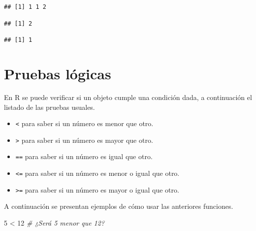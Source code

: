 \documentclass[10pt,]{krantz}
\makeatletter
\newenvironment{Shaded}{\begin{snugshade}}{\end{snugshade}}
\newcommand{\DecValTok}[1]{\textcolor[rgb]{0.00,0.00,0.81}{{#1}}}
\newcommand{\StringTok}[1]{\textcolor[rgb]{0.31,0.60,0.02}{{#1}}}
\newcommand{\CommentTok}[1]{\textcolor[rgb]{0.56,0.35,0.01}{\textit{{#1}}}}
\newcommand{\NormalTok}[1]{{#1}}
\providecommand{\tightlist}{%
  \setlength{\itemsep}{0pt}\setlength{\parskip}{0pt}}
\let\proglang=\textsf
\newenvironment{kframe}{%
\medskip{}
\setlength{\fboxsep}{.8em}
 \def\at@end@of@kframe{}%
 \ifinner\ifhmode%
  \def\at@end@of@kframe{\end{minipage}}%
  \begin{minipage}{\columnwidth}%
 \fi\fi%
 \def\FrameCommand##1{\hskip\@totalleftmargin \hskip-\fboxsep
 \colorbox{shadecolor}{##1}\hskip-\fboxsep
     \hskip-\linewidth \hskip-\@totalleftmargin \hskip\columnwidth}%
 \MakeFramed {\advance\hsize-\width
   \@totalleftmargin\z@ \linewidth\hsize
   \@setminipage}}%
 {\par\unskip\endMakeFramed%
 \at@end@of@kframe}
\renewenvironment{Shaded}{\begin{kframe}}{\end{kframe}}
\makeatother
\begin{document}
\begin{verbatim}
## [1] 1 1 2
\end{verbatim}

\begin{Shaded}
\end{Shaded}

\begin{verbatim}
## [1] 2
\end{verbatim}

\begin{Shaded}
\end{Shaded}

\begin{verbatim}
## [1] 1
\end{verbatim}

\section{\texorpdfstring{Pruebas lógicas
}{Pruebas lógicas }}\label{pruebas-logicas}

En \proglang{R} se puede verificar si un objeto cumple una condición
dada, a continuación el listado de las pruebas usuales.

\begin{itemize}
\tightlist
\item
  \texttt{\textless{}} para saber si un número es menor que otro.
\item
  \texttt{\textgreater{}} para saber si un número es mayor que otro.
\item
  \texttt{==} para saber si un número es igual que otro.
\item
  \texttt{\textless{}=} para saber si un número es menor o igual que
  otro.
\item
  \texttt{\textgreater{}=} para saber si un número es mayor o igual que
  otro.
\end{itemize}

A continuación se presentan ejemplos de cómo usar las anteriores
funciones.

\begin{Shaded}
\begin{Highlighting}[]
\DecValTok{5} \NormalTok{<}\StringTok{ }\DecValTok{12}  \CommentTok{# ¿Será 5 menor que 12?}
\end{Highlighting}
\end{Shaded}
\end{document}
